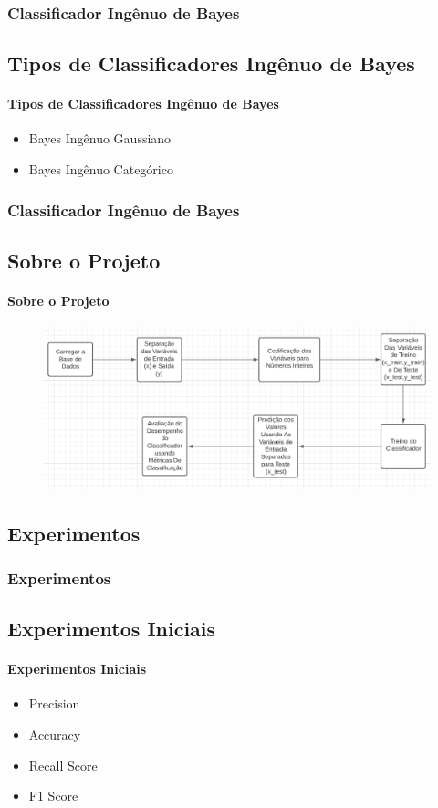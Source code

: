 \documentclass{beamer}
\begin{document}
\begin{frame}
\frametitle{Classificador Ingênuo de Bayes}
\subsection{Tipos de Classificadores Ingênuo de Bayes}
\framesubtitle{Tipos de Classificadores Ingênuo de Bayes}
\begin{itemize}
\item Bayes Ingênuo Gaussiano
\item Bayes Ingênuo Categórico
\end{itemize}
\end{frame}


\begin{frame}
\frametitle{Classificador Ingênuo de Bayes}
\subsection{Sobre o Projeto}
\framesubtitle{Sobre o Projeto}
\begin{figure}[H]
    \centerline{\includegraphics[width=1.0\textwidth]{IMGS/block1.png}}
\end{figure}    
\end{frame}


\begin{frame}
\section{Experimentos} 
\frametitle{Experimentos}
\subsection{Experimentos Iniciais}
\framesubtitle{Experimentos Iniciais}
\begin{itemize}
\item Precision
\item Accuracy
\item Recall Score
\item F1 Score
\end{itemize}
\end{frame}
\end{document}

